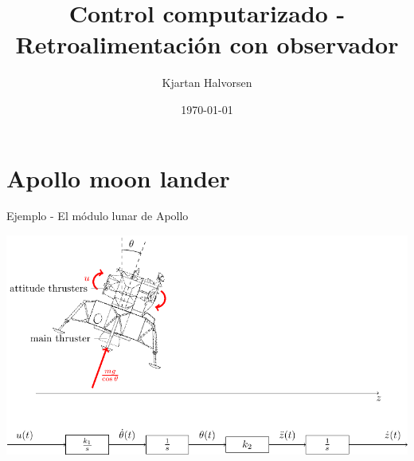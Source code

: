 \documentclass[presentation,aspectratio=1610]{beamer}
\author{Kjartan Halvorsen}
\date{\today}
\title{Control computarizado - Retroalimentación con observador}
\begin{document}
\maketitle

\section{Apollo moon lander}
\label{sec:org0de76d9}
\begin{frame}[label={sec:org694beea}]{Ejemplo - El módulo lunar de Apollo}
\begin{center}
\includegraphics[width=\linewidth]{fig-apollo}
\end{center}
\end{frame}
\end{document}
